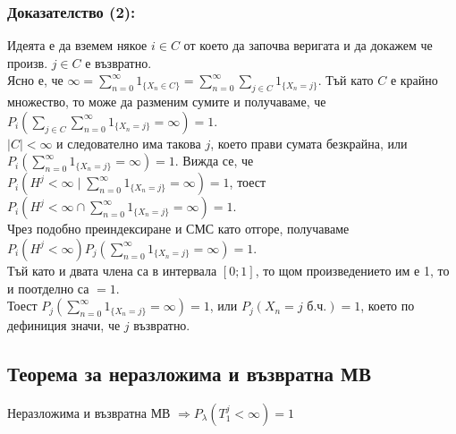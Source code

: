 \documentclass{article}
\begin{document}
\subsubsection*{Доказателство (2):}
Идеята е да вземем някое $i \in C$ от което да започва веригата и да докажем че произв. $j \in C$ е възвратно. \\
Ясно е, че $\infty = \sum_{n=0}^\infty 1_{\{X_n \in C\}} = \sum_{n=0}^\infty \sum_{j \in C} 1_{\{X_n = j\}}$. Тъй като $C$ е крайно 
множество, то може да разменим сумите и получаваме, че \\ $P_i\left(\sum_{j \in C} \sum_{n=0}^\infty 1_{\{X_n = j\}} = \infty\right) = 1$. \\
$|C| < \infty$ и следователно има такова $j$, което прави сумата безкрайна, или $P_i\left(\sum_{n=0}^\infty 1_{\{X_n = j\}} = \infty\right) = 1$.
Вижда се, че \\ $P_i\left(H^j < \infty \mid \sum_{n=0}^\infty 1_{\{X_n = j\}} = \infty\right) = 1$, тоест \\ $P_i\left(H^j < \infty \cap \sum_{n=0}^\infty 1_{\{X_n = j\}} = \infty\right) = 1$. \\
Чрез подобно преиндексиране и СМС като отгоре, получаваме \\ $P_i(H^j < \infty)P_j\left(\sum_{n=0}^\infty 1_{\{X_n = j\}} = \infty\right) = 1$. \\
Тъй като и двата члена са в интервала $[0;1]$, то щом произведението им е 1, то и поотделно са $= 1$. \\
Тоест $P_j\left(\sum_{n=0}^\infty 1_{\{X_n = j\}} = \infty\right) = 1$, или $P_j(X_n = j \text{ б.ч.}) = 1$, което по дефиниция значи, че $j$ възвратно.

\subsection{Теорема за неразложима и възвратна МВ}
Неразложима и възвратна МВ $\Rightarrow P_\lambda(T_1^j < \infty) = 1$
\end{document}
